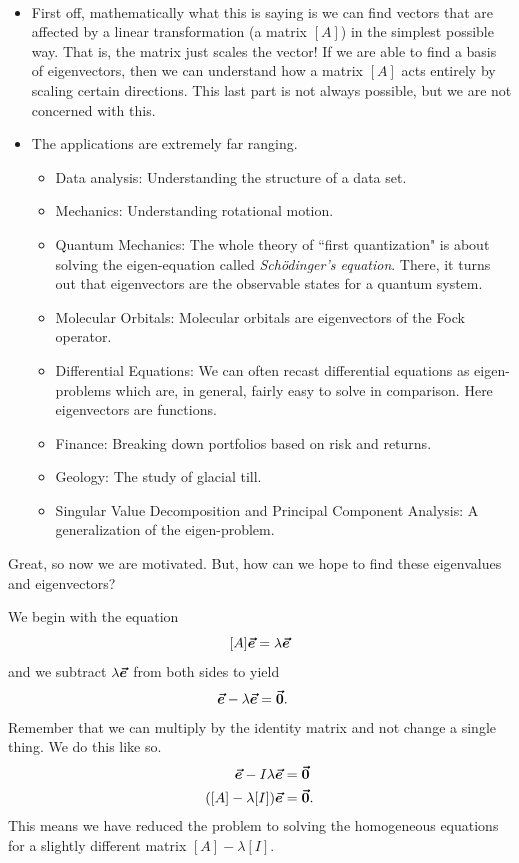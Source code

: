         \begin{answer}~
        \begin{itemize}
            \item First off, mathematically what this is saying is we can find vectors that are affected by a linear transformation (a matrix $[A]$) in the simplest possible way.  That is, the matrix just scales the vector!  If we are able to find a basis of eigenvectors, then we can understand how a matrix $[A]$ acts entirely by scaling certain directions. This last part is not always possible, but we are not concerned with this.
            \item The applications are extremely far ranging.  
            \begin{itemize}
                \item Data analysis: Understanding the structure of a data set.
                \item Mechanics: Understanding rotational motion.
                \item Quantum Mechanics: The whole theory of ``first quantization" is about solving the eigen-equation called \emph{Sch\"odinger's equation}. There, it turns out that eigenvectors are the observable states for a quantum system.
                \item Molecular Orbitals: Molecular orbitals are eigenvectors of the Fock operator.
                \item Differential Equations: We can often recast differential equations as eigen-problems which are, in general, fairly easy to solve in comparison. Here eigenvectors are functions.
                \item Finance: Breaking down portfolios based on risk and returns.
                \item Geology: The study of glacial till.
                \item Singular Value Decomposition and Principal Component Analysis: A generalization of the eigen-problem.
            \end{itemize}
        \end{itemize}
        \end{answer}
        
        Great, so now we are motivated.  But, how can we hope to find these eigenvalues and eigenvectors?  
        
        We begin with the equation
        \[
        [A]\boldsymbol{\vec{e}}=\lambda \boldsymbol{\vec{e}}
        \]
        and we subtract $\lambda \boldsymbol{\vec{e}}$ from both sides to yield
        \begin{align*}
            [A]\evec-\lambda \evec&=\zerovec.
        \end{align*}
        Remember that we can multiply by the identity matrix and not change a single thing.  We do this like so.
        \begin{align*}
            [A]\evec- I \lambda \evec&=\zerovec\\
            ([A]-\lambda [I])\evec&=\zerovec.
        \end{align*}
        This means we have reduced the problem to solving the homogeneous equations for a slightly different matrix $[A]-\lambda [I]$.  
        
